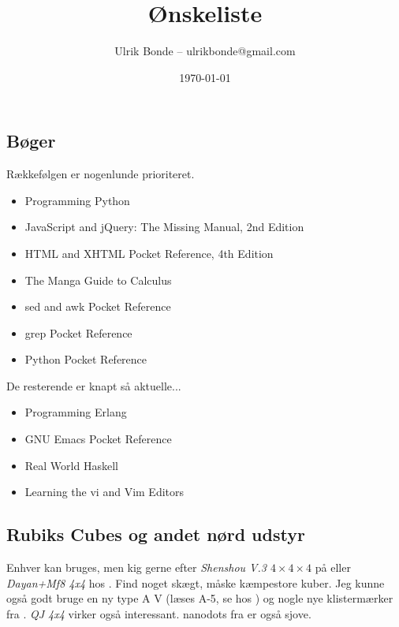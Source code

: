 \documentclass[a4paper, danish, 10pt, final]{article}
\title{Ønskeliste}
\author{Ulrik Bonde -- ulrikbonde@gmail.com}
\date{\today}
\begin{document}
\maketitle

\subsection*{Bøger}

Rækkefølgen er nogenlunde prioriteret.
\begin{itemize}
    \item Programming Python \citep{lutz2011progpython}
    \item JavaScript and jQuery: The Missing Manual, 2nd Edition \cite{javascriptjquery}
    \item HTML and XHTML Pocket Reference, 4th Edition \cite{htmlxhtml}
    \item The Manga Guide to Calculus \citep{kojima2009calc}
    \item sed and awk Pocket Reference \citep{robbins200206}
    \item grep Pocket Reference \citep{bambenekKlus200901}
    \item Python Pocket Reference \citep{lutz2009python}
\end{itemize}
De resterende er knapt så aktuelle...
\begin{itemize}
    \item Programming Erlang \citep{armstrong2007pe}
    \item GNU Emacs Pocket Reference \citep{cameron199811}
    \item Real World Haskell \citep{osullivanGoerzenStewart200812}
    \item Learning the vi and Vim Editors \citep{robbinsHannahLamb200807}
\end{itemize}

\subsection*{Rubiks Cubes og andet nørd udstyr}

Enhver kan bruges, men kig gerne efter \emph{Shenshou V.3 $4\times4\times4$} på
\cite{gamesweb} eller \emph{Dayan+Mf8 4x4} hos \cite{cubikon}. Find noget
skægt, måske kæmpestore kuber. Jeg kunne også godt bruge en ny type A V (læses
        A-5, se hos \cite{gamesweb}) og nogle nye klistermærker fra
\cite{cubesmith}. \emph{QJ 4x4} virker også interessant. nanodots fra
\cite{gamesweb} er også sjove.
\end{document}
